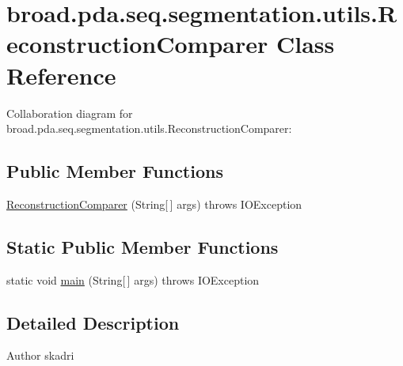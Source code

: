 \hypertarget{classbroad_1_1pda_1_1seq_1_1segmentation_1_1utils_1_1_reconstruction_comparer}{\section{broad.\+pda.\+seq.\+segmentation.\+utils.\+Reconstruction\+Comparer Class Reference}
\label{classbroad_1_1pda_1_1seq_1_1segmentation_1_1utils_1_1_reconstruction_comparer}
}


Collaboration diagram for broad.\+pda.\+seq.\+segmentation.\+utils.\+Reconstruction\+Comparer\+:
\subsection*{Public Member Functions}
\begin{DoxyCompactItemize}
\item 
\hyperlink{classbroad_1_1pda_1_1seq_1_1segmentation_1_1utils_1_1_reconstruction_comparer_a42481f06518d110efbf07e8efa8148fc}{Reconstruction\+Comparer} (String\mbox{[}$\,$\mbox{]} args)  throws I\+O\+Exception
\end{DoxyCompactItemize}
\subsection*{Static Public Member Functions}
\begin{DoxyCompactItemize}
\item 
static void \hyperlink{classbroad_1_1pda_1_1seq_1_1segmentation_1_1utils_1_1_reconstruction_comparer_a1e44a1ad1fe857c320525d92e128bed7}{main} (String\mbox{[}$\,$\mbox{]} args)  throws I\+O\+Exception
\end{DoxyCompactItemize}


\subsection{Detailed Description}
\begin{DoxyAuthor}{Author}
skadri 
\end{DoxyAuthor}


